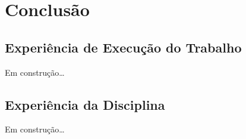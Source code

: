 \chapter{Conclusão}

\section{Experiência de Execução do Trabalho}

  Em construção\ldots

\section{Experiência da Disciplina}

  Em construção\ldots

